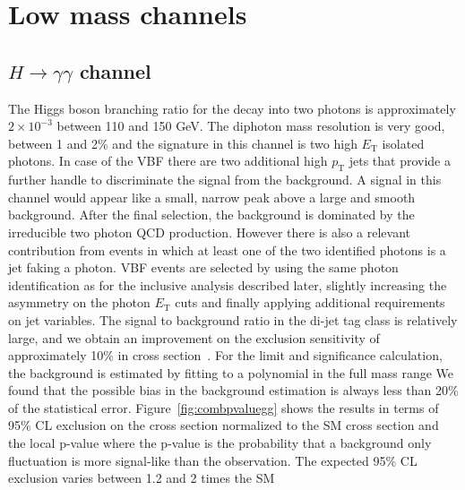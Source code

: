 \documentclass{cimento}
\newcommand{\et}{\ensuremath{E_{\mathrm{T}}}\xspace}
\newcommand{\pt}{\ensuremath{p_{\mathrm{T}}}\xspace}
\begin{document}
\section{Low mass channels}

%
%

\subsection{$H \to \gamma\gamma$ channel}

The Higgs boson branching ratio for the decay into two photons is
approximately $2\times 10^{-3}$ between 110 and 150 GeV.  The diphoton
mass resolution is very good, between 1 and 2\% and the signature in
this channel is two high \et isolated photons.  In case of the VBF
there are two additional high \pt jets that provide a further handle
to discriminate the signal from the background.  A signal in this
channel would appear like a small, narrow peak above a large and
smooth background.  After the final selection, the background is
dominated by the irreducible two photon QCD production. However there
is also a relevant contribution from events in which at least one of
the two identified photons is a jet faking a photon.  
VBF events are selected by using the same photon identification as for
the inclusive analysis described later, slightly increasing the
asymmetry on the photon \et cuts and finally applying additional
requirements on jet variables.  The signal to background ratio in the
di-jet tag class is relatively large, and we obtain an improvement on
the exclusion sensitivity of approximately 10\% in cross
section~\cite{Chatrchyan:2012tw,HIG-12-001}.
%
For the limit and significance calculation, the background is
estimated by fitting to a polynomial in the full mass range
We found that the possible bias in the background estimation is always
less than 20\% of the statistical error.
%
Figure~\ref{fig:combpvaluegg} shows the results in terms of 95\% CL
exclusion on the cross section normalized to the SM cross section and
the local p-value where the p-value is the probability that a
background only fluctuation is more signal-like than the observation.
The expected 95\% CL exclusion varies between 1.2 and 2 times the SM
\end{document}
